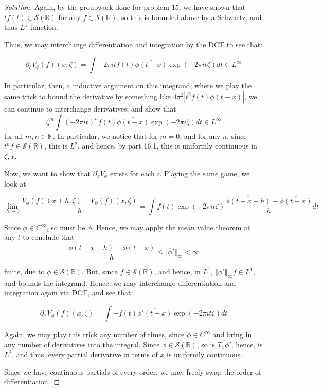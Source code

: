 \documentclass[10pt]{article}
\begin{document}
\begin{proof}[Solution]
Again, by the groupwork done for problem 15, we have shown that $t f(t) \in \mathcal{S}(\mathbb{R})$ for any $f \in \mathcal{S}(\mathbb{R})$, so this is bounded above by a Schwartz, and thus $L^1$ function.

Thus, we may interchange differentiation and integration by the DCT to see that:

$$ \partial_\zeta V_\phi(f)(x, \zeta) = \int - 2\pi i t f(t) \overline{\phi(t - x)} \exp(-2 \pi i t \zeta) dt \in L^\infty $$

In particular, then, a inductive argument on this integrand, where we play the same trick to bound the derivative by something like $4\pi^2 |t^2 f(t) \overline{\phi(t - x)}|$, we can continue to interchange derivatives, and show that $$\zeta^m \int (-2 \pi i t)^n f(t) \overline{\phi(t - x)}  \exp(-2 \pi i \zeta) dt \in L^\infty$$ for all $m, n \in \mathbb{N}$. In particular, we notice that for $m = 0$, and for any $n$, since $t^n f \in \mathcal{S}(\mathbb{R})$, this is $L^2$, and hence, by part 16.1, this is uniformly continuous in $\zeta, x$.

Now, we want to show that $\partial_x^i V_\phi$ exists for each $i$. Playing the same game, we look at

$$ \lim_{h \to 0} \frac{ V_\phi(f) (x + h, \zeta) - V_\phi(f)  (x, \zeta)}{h} = \int f(t) \exp(-2\pi i t \zeta) \frac{\overline{\phi(t - x - h)} - \overline{\phi(t - x)}}{h} dt $$ 

Since $\phi \in C^\infty$, so must be $\overline{\phi}$. Hence, we may apply the mean value theorem at any $t$ to conclude that $$\frac{\overline{\phi(t - x - h)} - \overline{\phi(t - x)}}{h} \leq \Vert \overline{\phi}' \Vert_\infty < \infty $$

finite, due to $\overline{\phi} \in \mathcal{S}(\mathbb{R})$. But, since $f \in \mathcal{S}(\mathbb{R})$, and hence, in $L^1$, $\Vert \overline{\phi}' \Vert_\infty f \in L^1$, and bounds the integrand. Hence, we may interchange differentiation and integration again via DCT, and see that:

$$\partial_x V_\phi(f)(x, \zeta) = \int -f(t) \overline{\phi'(t - x)} \exp(-2\pi i t \zeta) dt $$

Again, we may play this trick any number of times, since $\phi \in C^\infty$ and bring in any number of derivatives into the integral. Since $\phi \in \mathcal{S}(\mathbb{R})$, so is $\overline{T_x \phi'}$, hence, is $L^2$, and thus, every partial derivative in terms of $x$ is uniformly continuous.

Since we have continuous partials of every order, we may freely swap the order of differentiation.


\end{proof}
\end{document}
